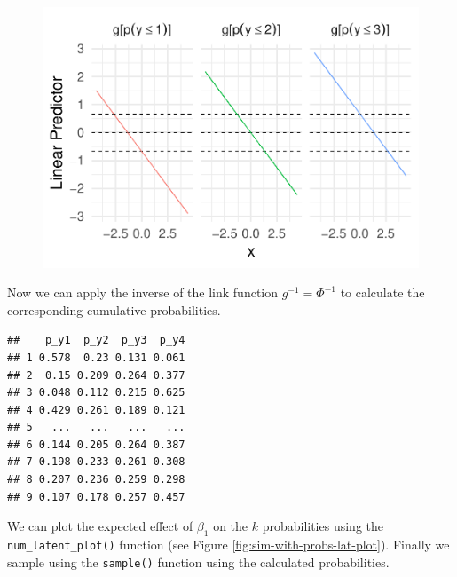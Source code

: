 \documentclass[
  man,floatsintext]{apa6}
\begin{document}
\begin{figure}

{\centering \includegraphics{paper-new_files/figure-latex/unnamed-chunk-6-1} 

}

\caption{ }\label{fig:unnamed-chunk-6}
\end{figure}

\normalsize

Now we can apply the inverse of the link function \(g^{-1} = \Phi^{-1}\) to calculate the corresponding cumulative probabilities.

\scriptsize

\normalsize

\scriptsize

\begin{verbatim}
##    p_y1  p_y2  p_y3  p_y4
## 1 0.578  0.23 0.131 0.061
## 2  0.15 0.209 0.264 0.377
## 3 0.048 0.112 0.215 0.625
## 4 0.429 0.261 0.189 0.121
## 5   ...   ...   ...   ...
## 6 0.144 0.205 0.264 0.387
## 7 0.198 0.233 0.261 0.308
## 8 0.207 0.236 0.259 0.298
## 9 0.107 0.178 0.257 0.457
\end{verbatim}

\normalsize

We can plot the expected effect of \(\beta_1\) on the \(k\) probabilities using the \texttt{num\_latent\_plot()} function (see Figure \ref{fig:sim-with-probs-lat-plot}). Finally we sample using the \texttt{sample()} function using the calculated probabilities.

\scriptsize
\end{document}
